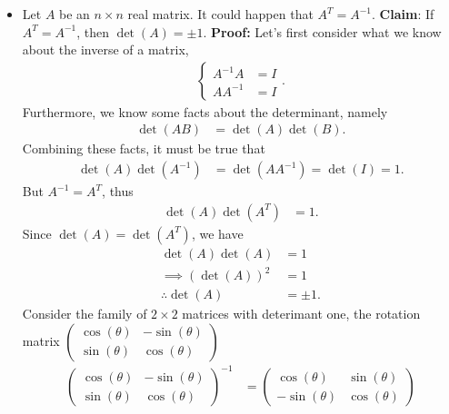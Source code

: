 \documentclass{report}
\begin{document}
\begin{itemize}
        \item Let $A$ be an $n\times n$ real matrix. It could happen that $A^{T} = A^{-1}$.
            \bigbreak \noindent 
            \textbf{Claim}: If $A^{T} = A^{-1}$, then $\det(A) = \pm1$.
            \bigbreak \noindent 
            \textbf{Proof:} Let's first consider what we know about the inverse of a matrix,
            \begin{align*}
                \begin{cases} A^{-1}A &= I \\ AA^{-1} &= I \end{cases}
            .\end{align*}
            Furthermore, we know some facts about the determinant, namely
            \begin{align*}
                \det(AB) &= \det(A)\det(B)
            .\end{align*}
            Combining these facts, it must be true that
            \begin{align*}
                \det(A)\det(A^{-1}) &= \det(AA^{-1}) = \det(I) = 1
            .\end{align*}
            But $A^{-1} = A^{T}$, thus
            \begin{align*}
                \det(A)\det(A^{T}) &= 1 
            .\end{align*}
            Since $\det(A) = \det(A^{T})$, we have
            \begin{align*}
                \det(A)\det(A) &= 1 \\
                \implies (\det(A))^{2} &= 1 \\
                \therefore \det(A) &= \pm 1
            .\end{align*}
            \bigbreak \noindent 
            Consider the family of $2\times 2$ matrices with deterimant one, the rotation matrix $\begin{pmatrix} \cos{\left(\theta \right)} & -\sin{\left(\theta \right)} \\ \sin{\left(\theta \right)} & \cos{\left(\theta \right)}\end{pmatrix} $
            \begin{align*}
                \begin{pmatrix} \cos{\left(\theta \right)} & -\sin{\left(\theta \right)} \\ \sin{\left(\theta \right)} & \cos{\left(\theta \right)}\end{pmatrix}^{-1} &=  \begin{pmatrix} \cos{\left(\theta \right)} & \sin{\left(\theta \right)} \\ -\sin{\left(\theta \right)} & \cos{\left(\theta \right)}\end{pmatrix} \\

\end{align*}
\end{itemize}
\end{document}
